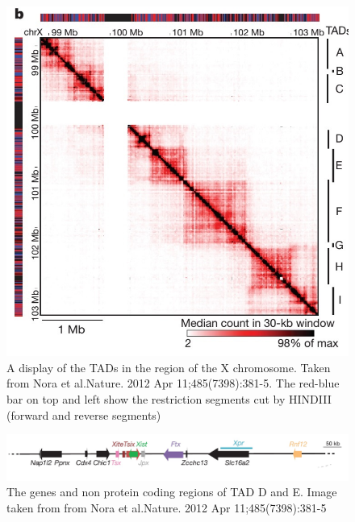 \documentclass[12pt]{paper}
\begin{document}
 
\begin{figure}[H]\label{TADsOfTheXChromosome}
\includegraphics*[scale=0.5]{TADsOfTheXChromosome_NoraEtAl2012}
\caption{\scriptsize{A display of the TADs in the region of the X chromosome. Taken from Nora et al.Nature. 2012 Apr 11;485(7398):381-5. The red-blue bar on top and left show the restriction segments cut by HINDIII (forward and reverse segments)}}
\end{figure}

\begin{figure}[H]\label{genesOfTadDandE}
\includegraphics[scale=0.3]{geneSequencesTADDandE}
\caption{\scriptsize{The genes and non protein coding regions of TAD D and E. Image taken from from Nora et al.Nature. 2012 Apr 11;485(7398):381-5}}
\end{figure}
\end{document}
